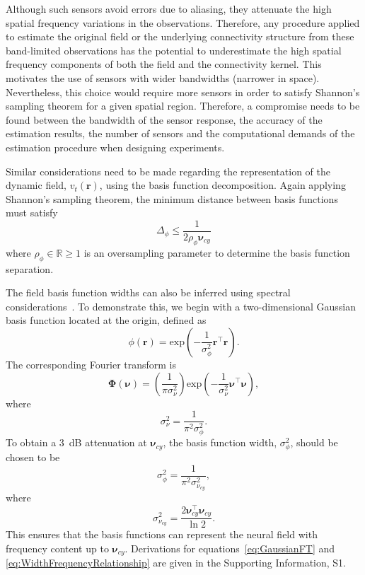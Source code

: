 \documentclass[10pt]{article}
\begin{document}
Although such sensors avoid errors due to aliasing, they attenuate the high spatial frequency variations in the observations. Therefore, any procedure applied to estimate the original field or the underlying connectivity structure from these band-limited observations has the potential to underestimate the high spatial frequency components of both the field and the connectivity kernel. This motivates the use of sensors with wider bandwidths (narrower in space). Nevertheless, this choice would require more sensors in order to satisfy Shannon's sampling theorem for a given spatial region. Therefore, a compromise needs to be found between the bandwidth of the sensor response, the accuracy of the estimation results, the number of sensors and the computational demands of the estimation procedure when designing experiments.

Similar considerations need to be made regarding the representation of the dynamic field, $v_t(\mathbf{r})$, using the basis function decomposition. Again applying Shannon's sampling theorem, the minimum distance between basis functions must satisfy 
\begin{equation}\label{eq:BasisFunctionSeparation}
	\Delta_{\phi} \leq \frac{1}{2\rho_{\phi}\boldsymbol{\nu}_{cy}}
\end{equation}
where $\rho_{\phi} \in \mathbb{R} \ge 1$ is an oversampling parameter to determine the basis function separation. 

The field basis function widths can also be inferred using spectral considerations~\cite{Sanner1992,Scerri2009}. To demonstrate this, we begin with a two-dimensional Gaussian basis function located at the origin, defined as
\begin{equation}\label{eq:BasisFunctionAtOrigin}
 \phi(\mathbf r)=\mathrm{exp}\left({-\frac{1}{\sigma_{\phi}^2} \mathbf r^\top\mathbf r}\right).
\end{equation}
The corresponding Fourier transform is
\begin{equation}\label{eq:GaussianFT}
\boldsymbol\Phi(\boldsymbol \nu)=\left(\frac{1}{\pi\sigma_{\nu}^2}\right)\mathrm{exp}\left(-\frac{1}{\sigma_{\nu}^2}\boldsymbol\nu^\top \boldsymbol\nu\right),
\end{equation}
where 
\begin{equation}\label{eq:GaussianFTWidth}
	\sigma^2_{\nu} = \frac{1}{\pi^2\sigma_{\phi}^2}. 
\end{equation}
To obtain a 3~dB attenuation at $\boldsymbol\nu_{cy}$, the basis function width, $\sigma^2_{\phi}$, should be chosen to be
\begin{equation}\label{eq:WidthCutOffRelationship}
 \sigma^2_{\phi}= \frac{1}{\pi^2\sigma_{\nu_{cy}}^2},
\end{equation}
where
\begin{equation}\label{eq:WidthFrequencyRelationship}
 \sigma^2_{\nu_{cy}}= \frac{2\boldsymbol\nu_{cy}^\top \boldsymbol\nu_{cy}}{\ln2}.
\end{equation}
This ensures that the basis functions can represent the neural field with frequency content up to $\boldsymbol\nu_{cy}$. Derivations for equations~\ref{eq:GaussianFT} and \ref{eq:WidthFrequencyRelationship} are given in the Supporting Information, S1.
\end{document}
